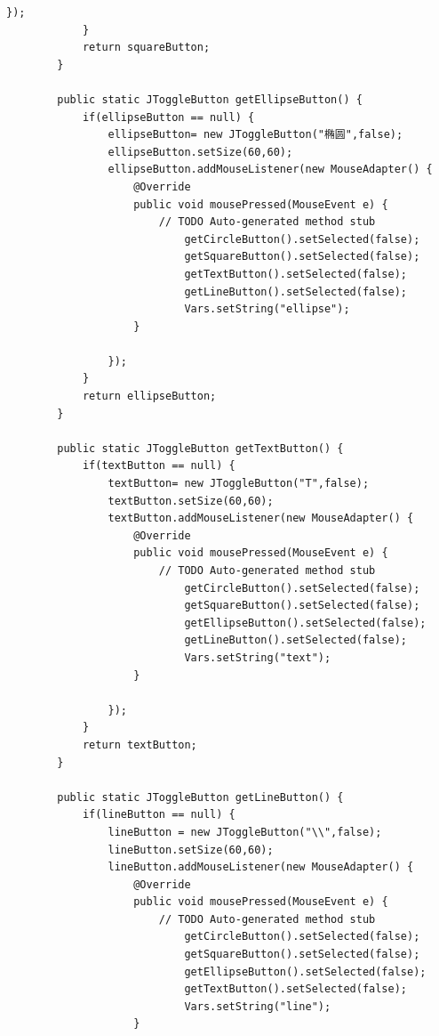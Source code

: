 \documentclass{ctexart}
\begin{document}
\begin{lstlisting}[caption = Vars.Java]
                });
            }
            return squareButton;
        }

        public static JToggleButton getEllipseButton() {
            if(ellipseButton == null) {
                ellipseButton= new JToggleButton("椭圆",false);
                ellipseButton.setSize(60,60);
                ellipseButton.addMouseListener(new MouseAdapter() {			
                    @Override
                    public void mousePressed(MouseEvent e) {
                        // TODO Auto-generated method stub
                            getCircleButton().setSelected(false);
                            getSquareButton().setSelected(false);
                            getTextButton().setSelected(false);
                            getLineButton().setSelected(false);
                            Vars.setString("ellipse");
                    }
    
                });
            }
            return ellipseButton;
        }

        public static JToggleButton getTextButton() {
            if(textButton == null) {
                textButton= new JToggleButton("T",false);
                textButton.setSize(60,60);
                textButton.addMouseListener(new MouseAdapter() {			
                    @Override
                    public void mousePressed(MouseEvent e) {
                        // TODO Auto-generated method stub
                            getCircleButton().setSelected(false);
                            getSquareButton().setSelected(false);
                            getEllipseButton().setSelected(false);
                            getLineButton().setSelected(false);
                            Vars.setString("text");
                    }
    
                });
            }
            return textButton;
        }

        public static JToggleButton getLineButton() {
            if(lineButton == null) {
                lineButton = new JToggleButton("\\",false);
                lineButton.setSize(60,60);
                lineButton.addMouseListener(new MouseAdapter() {			
                    @Override
                    public void mousePressed(MouseEvent e) {
                        // TODO Auto-generated method stub
                            getCircleButton().setSelected(false);
                            getSquareButton().setSelected(false);
                            getEllipseButton().setSelected(false);
                            getTextButton().setSelected(false);
                            Vars.setString("line");
                    }
    

\end{lstlisting}
\end{document}
